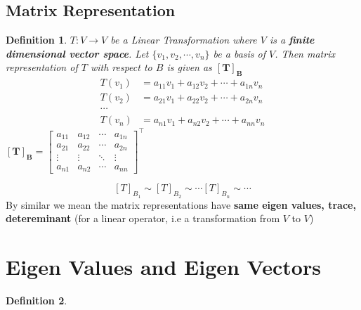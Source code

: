 \documentclass[a4paper, titlepage]{article}
\newtheorem{definition}{Definition}[section]
\begin{document}
    \subsection{Matrix Representation}
        \begin{definition}
            $T: V \rightarrow V$ be a Linear Transformation where $V$
            is a \textbf{finite dimensional vector space}. Let $\{
            v_1, v_2, \cdots, v_n\}$ be a basis of $V$. Then matrix
            representation of $T$ with respect to $B$ is given as $\bm{[T]_B}$
            \begin{align*}
                T(v_1) &= a_{11}v_1 + a_{12}v_2 + \cdots + a_{1n}v_n \\
                T(v_2) &= a_{21}v_1 + a_{22}v_2 + \cdots + a_{2n}v_n \\
                \cdots \\
                T(v_n) &= a_{n1}v_1 + a_{n2}v_2 + \cdots + a_{nn}v_n
            \end{align*}
            $
                \bm{[T]_B} = 
                        \begin{bmatrix}
                            a_{11} & a_{12} & \cdots & a_{1n} \\
                            a_{21} & a_{22} & \cdots & a_{2n} \\
                            \vdots & \vdots & \ddots & \vdots \\
                            a_{n1} & a_{n2} & \cdots & a_{nn}
                        \end{bmatrix} ^ \intercal
            $
        \end{definition}
        $$[T]_{B_1} \sim [T]_{B_2} \sim \cdots [T]_{B_n} \sim \cdots $$
        By similar we mean the matrix representations have \textbf{%
        same eigen values, trace, detereminant} (for a linear 
        operator, i.e a transformation from $V$ to $V$)

    \section{Eigen Values and Eigen Vectors}
        \begin{definition}
            
        \end{definition}
\end{document}
